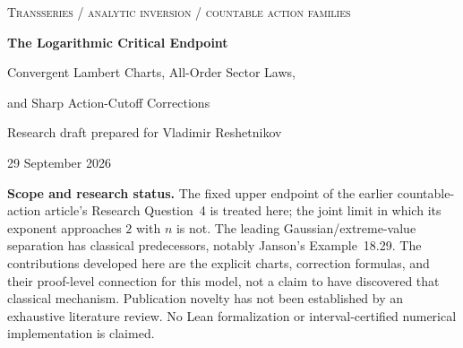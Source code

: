 \documentclass[11pt,a4paper]{article}
\numberwithin{equation}{section}
\theoremstyle{definition}
\theoremstyle{remark}
\begin{document}
\begin{center}
{\small\scshape Transseries / analytic inversion / countable action families}\par
\vspace{12pt}
{\LARGE\bfseries The Logarithmic Critical Endpoint}\par
\vspace{7pt}
{\Large Convergent Lambert Charts, All-Order Sector Laws,\par and Sharp Action-Cutoff Corrections}\par
\vspace{13pt}
{\normalsize Research draft prepared for Vladimir Reshetnikov}\par
{\small 29 September 2026}
\end{center}
\vspace{5pt}
\begin{abstract}
For the positive countable-action equation
\[
 U_\beta(q)=\beta\sum_{j\ge1}a_jq^j e^{jU_\beta(q)},
 \qquad a_j=a j^{-3}\quad\text{outside a finite set},
\]
the critical inverse is neither an analytic square-root fold nor the
fractional Hahn chart associated with a nonintegral power tail. We derive its
logarithmic normal form and construct an exact, convergent two-variable
analytic chart over the negative real branch of Lambert's $W$ function.
An exact Lambert normalization also yields an arbitrary-order, uniformly
additive inverse-logarithmic expansion of the sector coefficients, with
explicit Gaussian--logarithmic Fourier kernels. We then obtain a uniform
finite-coupling refinement of the action-cutoff profile, including its
$1/\sqrt{\log n}$ and $(\log\log n)/\log n$ corrections. Two scales separate:
fluctuations have order $\sqrt{n\log n}$, whereas preserving the $n$th sector
requires and, in the critical window, is equivalent to retaining
$M\gg\sqrt n$ actions. A convergent implicit chart gives all inverse-logarithmic
orders of the finite-action critical-point drift and explains the same cutoff
law from moving analytic folds. A final theorem extends the leading scale
separation to logarithmically weighted cubic tails, including the borderline
$j^{-3}/\log j$ case. Conventional proofs, exact algebraic checks, and
reproducible numerical diagnostics are supplied.
\end{abstract}

\noindent\textbf{Scope and research status.}
The fixed upper endpoint of the earlier countable-action article's Research
Question~4 is treated here; the joint limit in which its exponent approaches
$2$ with $n$ is not. The leading Gaussian/extreme-value separation has
classical predecessors, notably Janson's Example~18.29. The contributions
developed here are the explicit charts, correction formulas, and their
proof-level connection for this model, not a claim to have discovered that
classical mechanism. Publication novelty has not been established by an
exhaustive literature review. No Lean formalization or interval-certified
numerical implementation is claimed.
\end{document}
